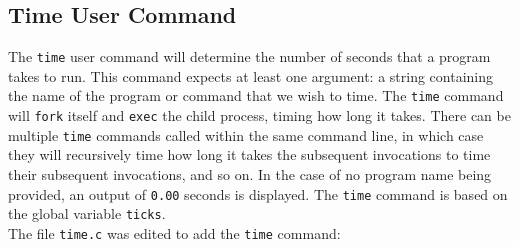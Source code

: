 \documentclass[11pt,letterpaper]{report}
\begin{document}
	\newpage
	\subsection*{Time User Command}
	
	The {\tt time} user command will determine the number of seconds that a program takes to run. This command expects at least one argument: a string containing the name of the program or command that we wish to time. The {\tt time} command will {\tt fork} itself and {\tt exec} the child process, timing how long it takes. There can be multiple {\tt time} commands called within the same command line, in which case they will recursively time how long it takes the subsequent invocations to time their subsequent invocations, and so on. In the case of no program name being provided, an output of {\tt 0.00} seconds is displayed. The {\tt time} command is based on the global variable {\tt ticks}.\\
	The file {\tt time.c} was edited to add the {\tt time} command:
\end{document}
